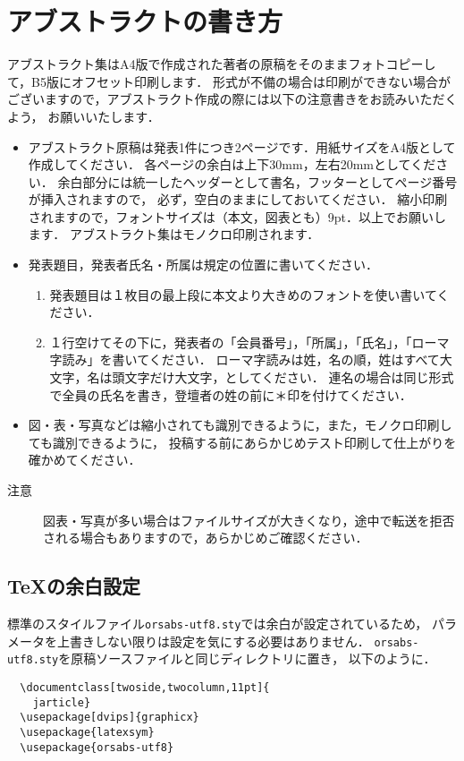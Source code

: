 \documentclass[twoside,twocolumn,11pt]{jarticle}  %
\begin{document}
\section{アブストラクトの書き方}
アブストラクト集はA4版で作成された著者の原稿をそのままフォトコピーして，B5版にオフセット印刷します．
形式が不備の場合は印刷ができない場合がございますので，アブストラクト作成の際には以下の注意書きをお読みいただくよう，
お願いいたします． 
\begin{itemize}
\item  アブストラクト原稿は発表1件につき2ページです．用紙サイズをA4版として作成してください．
	各ページの余白は上下30mm，左右20mmとしてください．
	余白部分には統一したヘッダーとして書名，フッターとしてページ番号が挿入されますので，
	必ず，空白のままにしておいてください．
	縮小印刷されますので，フォントサイズは（本文，図表とも）9pt．以上でお願いします．
	アブストラクト集はモノクロ印刷されます． 
\item  発表題目，発表者氏名・所属は規定の位置に書いてください．
  \begin{enumerate}
  \item  発表題目は１枚目の最上段に本文より大きめのフォントを使い書いてください． 
  \item  １行空けてその下に，発表者の「会員番号」，「所属」，「氏名」，「ローマ字読み」を書いてください．
	ローマ字読みは姓，名の順，姓はすべて大文字，名は頭文字だけ大文字，としてください．
	連名の場合は同じ形式で全員の氏名を書き，登壇者の姓の前に＊印を付けてください．
  \end{enumerate}
\item  図・表・写真などは縮小されても識別できるように，また，モノクロ印刷しても識別できるように，
	投稿する前にあらかじめテスト印刷して仕上がりを確かめてください． 
\end{itemize}

\begin{description}
\item[注意]  図表・写真が多い場合はファイルサイズが大きくなり，途中で転送を拒否される場合もありますので，あらかじめご確認ください．
\end{description}


\subsection{\TeX の余白設定}
標準のスタイルファイル\texttt{orsabs-utf8.sty}では余白が設定されているため，
パラメータを上書きしない限りは設定を気にする必要はありません．
\texttt{orsabs-utf8.sty}を原稿ソースファイルと同じディレクトリに置き，
以下のように\verb@{}．
\begin{verbatim}
  \documentclass[twoside,twocolumn,11pt]{
    jarticle}
  \usepackage[dvips]{graphicx}
  \usepackage{latexsym}
  \usepackage{orsabs-utf8}
\end{verbatim} 
\end{document}
